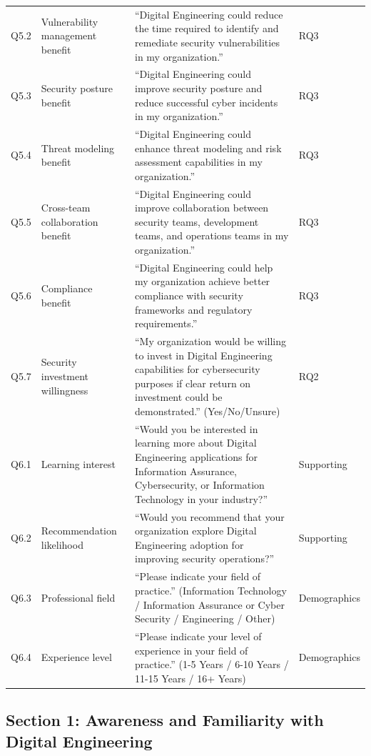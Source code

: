 {\begin{longtable}{@{}l p{2.9cm} p{7.5cm} l@{}}
Q5.2 & Vulnerability management benefit & ``Digital Engineering could reduce the time required to identify and remediate security vulnerabilities in my organization.'' & RQ3 \\
Q5.3 & Security posture benefit & ``Digital Engineering could improve security posture and reduce successful cyber incidents in my organization.'' & RQ3 \\
Q5.4 & Threat modeling benefit & ``Digital Engineering could enhance threat modeling and risk assessment capabilities in my organization.'' & RQ3 \\
Q5.5 & Cross-team collaboration benefit & ``Digital Engineering could improve collaboration between security teams, development teams, and operations teams in my organization.'' & RQ3 \\
Q5.6 & Compliance benefit & ``Digital Engineering could help my organization achieve better compliance with security frameworks and regulatory requirements.'' & RQ3 \\
Q5.7 & Security investment willingness & ``My organization would be willing to invest in Digital Engineering capabilities for cybersecurity purposes if clear return on investment could be demonstrated.'' (Yes/No/Unsure) & RQ2 \\
Q6.1 & Learning interest & ``Would you be interested in learning more about Digital Engineering applications for Information Assurance, Cybersecurity, or Information Technology in your industry?'' & Supporting \\
Q6.2 & Recommendation likelihood & ``Would you recommend that your organization explore Digital Engineering adoption for improving security operations?'' & Supporting \\
Q6.3 & Professional field & ``Please indicate your field of practice.'' (Information Technology / Information Assurance or Cyber Security / Engineering / Other) & Demographics \\
Q6.4 & Experience level & ``Please indicate your level of experience in your field of practice.'' (1-5 Years / 6-10 Years / 11-15 Years / 16+ Years) & Demographics \\
\end{longtable}
}

\subsection{Section 1: Awareness and Familiarity with Digital Engineering}

